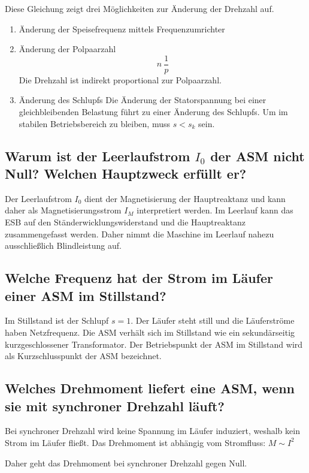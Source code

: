 \documentclass[conference]{IEEEtran}
\begin{document}
Diese Gleichung zeigt drei Möglichkeiten zur Änderung der Drehzahl auf.

\begin{enumerate}
    \item Änderung der Speisefrequenz mittels Frequenzumrichter

    \item Änderung der Polpaarzahl
          \begin{equation}
              n ~ \frac{1}{p}
          \end{equation}
          Die Drehzahl ist indirekt proportional zur Polpaarzahl.

    \item Änderung des Schlupfs
          Die Änderung der Statorspannung bei einer gleichbleibenden Belastung
          führt zu einer Änderung des Schlupfs. Um im stabilen Betriebsbereich
          zu bleiben, muss $s<s_{k}$ sein.

\end{enumerate}

\subsection{Warum ist der Leerlaufstrom $I_{0}$ der ASM nicht Null? Welchen
Hauptzweck erfüllt er?}

Der Leerlaufstrom $I_{0}$ dient der Magnetisierung der Hauptreaktanz und kann
daher als Magnetisierungsstrom $I_{M}$ interpretiert werden. Im Leerlauf kann
das ESB auf den Ständerwicklungswiderstand und die Hauptreaktanz
zusammengefasst werden. Daher nimmt die Maschine im Leerlauf nahezu
ausschließlich Blindleistung auf.

\subsection{Welche Frequenz hat der Strom im Läufer einer ASM im Stillstand?}

Im Stillstand ist der Schlupf $s=1$. Der Läufer steht still und die
Läuferströme haben Netzfrequenz. Die ASM verhält sich im Stillstand wie ein
sekundärseitig kurzgeschlossener Transformator. Der Betriebspunkt der ASM im
Stillstand wird als Kurzschlusspunkt der ASM bezeichnet.

\subsection{Welches Drehmoment liefert eine ASM, wenn sie mit synchroner
Drehzahl läuft?}

Bei synchroner Drehzahl wird keine Spannung im Läufer induziert, weshalb kein
Strom im Läufer fließt. Das Drehmoment ist abhängig vom Stromfluss: $M \sim
I^{2}$

Daher geht das Drehmoment bei synchroner Drehzahl gegen Null.
\end{document}
